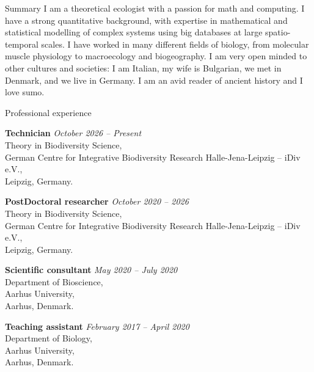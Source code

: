 \documentclass{resume} %
\begin{document}
\begin{rSection}{Summary}
I am a theoretical ecologist with a passion for math and computing. I have a strong quantitative background,
with expertise in mathematical and statistical modelling of complex systems using big databases at large
spatio-temporal scales. I have worked in many different fields of biology, from molecular muscle physiology
to macroecology and biogeography. I am very open minded to other cultures and societies: I am Italian,
my wife is Bulgarian, we met in Denmark, and we live in Germany. I am an avid reader of ancient history
and I love sumo.

\end{rSection}

\begin{rSection}{Professional experience}

{\bf Technician} \hfill {\em October 2026 -- Present}\\
Theory in Biodiversity Science,\\German Centre for Integrative Biodiversity Research Halle-Jena-Leipzig -- iDiv e.V.,\\Leipzig, Germany.

{\bf PostDoctoral researcher} \hfill {\em October 2020 -- 2026}\\
Theory in Biodiversity Science,\\German Centre for Integrative Biodiversity Research Halle-Jena-Leipzig -- iDiv e.V.,\\Leipzig, Germany.

{\bf Scientific consultant} \hfill {\em May 2020 -- July 2020}\\
Department of Bioscience,\\Aarhus University,\\Aarhus, Denmark.

{\bf Teaching assistant} \hfill {\em February 2017 -- April 2020}
\\Department of Biology,\\Aarhus University,\\Aarhus, Denmark.

\end{rSection}
\end{document}
